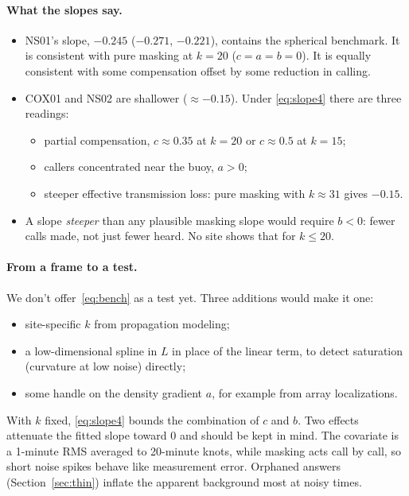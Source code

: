 \documentclass[11pt]{article}
\begin{document}
\paragraph{What the slopes say.}
\begin{itemize}
\item NS01's slope, $-0.245$ ($-0.271$, $-0.221$), contains the spherical
  benchmark. It is consistent with pure masking at $k=20$ ($c=a=b=0$). It is
  equally consistent with some compensation offset by some reduction in calling.
\item COX01 and NS02 are shallower ($\approx-0.15$). Under
  \eqref{eq:slope4} there are three readings:
  \begin{itemize}
  \item partial compensation, $c\approx0.35$ at $k=20$ or $c\approx0.5$ at $k=15$;
  \item callers concentrated near the buoy, $a>0$;
  \item steeper effective transmission loss: pure masking with $k\approx31$
    gives $-0.15$.
  \end{itemize}
\item A slope \emph{steeper} than any plausible masking slope would require
  $b<0$: fewer calls made, not just fewer heard. No site shows that for
  $k\le20$.
\end{itemize}

\paragraph{From a frame to a test.}
We don't offer~\eqref{eq:bench} as a test yet. Three additions would make it
one:
\begin{itemize}
\item site-specific $k$ from propagation modeling;
\item a low-dimensional spline in $L$ in place of the linear term, to detect
  saturation (curvature at low noise) directly;
\item some handle on the density gradient $a$, for example from array
  localizations.
\end{itemize}
With $k$ fixed, \eqref{eq:slope4} bounds the combination of $c$ and $b$. Two
effects attenuate the fitted slope toward 0 and should be kept in mind. The
covariate is a 1-minute RMS averaged to 20-minute knots, while masking acts
call by call, so short noise spikes behave like measurement error. Orphaned
answers (Section~\ref{sec:thin}) inflate the apparent background most at
noisy times.
\end{document}
